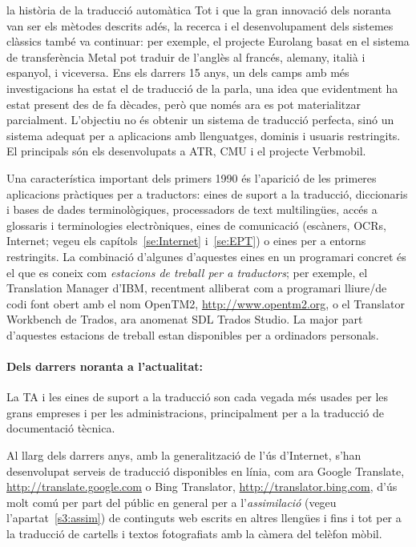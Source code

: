 \begin{persabermes}{la història de la traducció automàtica}
  Tot i que la gran innovació dels noranta van ser els mètodes
  descrits adés, la recerca i el desenvolupament dels sistemes
  clàssics també va continuar: per exemple, el projecte Eurolang basat
  en el sistema de transferència Metal pot traduir de l'anglès al
  francés, alemany, italià i espanyol, i viceversa.  Ens els darrers
  15 anys, un dels camps amb més investigacions ha estat el de
  traducció de la parla, una idea que evidentment ha estat present des
  de fa dècades, però que només ara es pot materialitzar parcialment.
  L'objectiu no és obtenir un sistema de traducció perfecta, sinó un
  sistema adequat per a aplicacions amb llenguatges, dominis i usuaris
  restringits. El principals són els desenvolupats a ATR, CMU i el
  projecte Verbmobil.

  Una característica important dels primers 1990 és l'aparició de les
  primeres aplicacions pràctiques per a traductors: eines de suport a
  la traducció, diccionaris i bases de dades terminològiques,
  processadors de text multilingües, accés a glossaris i terminologies
  electròniques, eines de comunicació (escàners, OCRs, Internet; vegeu
  els capítols~\ref{se:Internet} i~\ref{se:EPT}) o eines per a entorns
  restringits.  La combinació d'algunes d'aquestes eines en un
  programari concret és el que es coneix com \emph{estacions de
    treball per a traductors}; per exemple, el Translation Manager
  d'IBM, recentment alliberat com a programari lliure/de codi font
  obert amb el nom OpenTM2, \url{http://www.opentm2.org}, o el
  Translator Workbench de Trados, ara anomenat SDL Trados Studio. La
  major part d'aquestes estacions de treball estan disponibles per a
  ordinadors personals.

  \paragraph{Dels darrers noranta a l'actualitat:}
  La TA i les eines de suport a la traducció son cada vegada més
  usades per les grans empreses i per les administracions,
  principalment per a la traducció de documentació tècnica.

  Al llarg dels darrers anys, amb la generalització de l'ús
  d'Internet, s'han desenvolupat serveis de traducció disponibles en
  línia, com ara Google Translate, \url{http://translate.google.com} o
  Bing Translator, \url{http://translator.bing.com}, d'ús molt comú
  per part del públic en general per a l'\emph{assimilació} (vegeu
  l'apartat~\ref{s3:assim}) de continguts web escrits en altres
  llengües i fins i tot per a la traducció de cartells i textos
  fotografiats amb la càmera del telèfon mòbil.


\end{persabermes}
